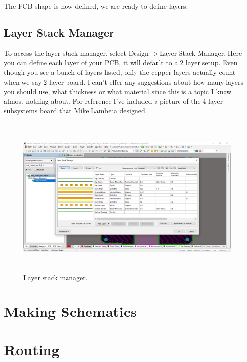 \documentclass{article}
\begin{document}
	The PCB shape is now defined, we are ready to define layers.
	
	\subsection{Layer Stack Manager}
	To access the layer stack manager, select Design-$>$Layer Stack Manager. Here you can define each layer of your PCB, it will default to a 2 layer setup. Even though you see a bunch of layers listed, only the copper layers actually count when we say 2-layer board. I can't offer any suggestions about how many layers you should use, what thickness or what material since this is a topic I know almost nothing about. For reference I've included a picture of the 4-layer subsystems board that Mike Lambeta designed.
	
	\begin{figure}[H]	
		\centering
		\includegraphics[width=16cm, height=8cm]{layer_stack.png}
		\caption{Layer stack manager.}
		\label{fig 6}
	\end{figure}
	
	
	\newpage
	\section{Making Schematics}
	\section{Routing}
	
\end{document}
